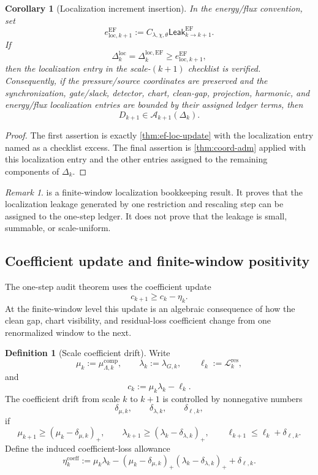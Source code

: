 \documentclass[11pt]{article}
\numberwithin{equation}{section}
\theoremstyle{plain}
\newtheorem{corollary}[theorem]{Corollary}
\theoremstyle{definition}
\newtheorem{definition}[theorem]{Definition}
\theoremstyle{remark}
\newtheorem{remark}[theorem]{Remark}
\newcommand{\comp}{\mathrm{comp}}
\newcommand{\locerr}{\mathrm{loc}}
\newcommand{\Leak}{\mathsf{Leak}}
\begin{document}
\begin{corollary}[Localization increment insertion]\label{cor:ef-loc-insertion}
In the energy/flux convention, set
\[
  e_{\locerr,k+1}^{\mathrm{EF}}
  :=
  C_{\lambda,\chi,\theta}\Leak_{k\to k+1}^{\mathrm{EF}}.
\]
If
\[
  \Delta_k^{\locerr}
  =
  \Delta_k^{\locerr,\mathrm{EF}}
  \ge
  e_{\locerr,k+1}^{\mathrm{EF}},
\]
then the localization entry in the scale-\((k+1)\) checklist is verified.
Consequently, if the pressure/source coordinates are preserved and the
synchronization, gate/slack, detector, chart, clean-gap, projection, harmonic,
and energy/flux localization entries are bounded by their assigned ledger
terms, then
\[
  D_{k+1}\in\mathcal A_{k+1}(\Delta_k).
\]
\end{corollary}

\begin{proof}
The first assertion is exactly \cref{thm:ef-loc-update} with the
localization entry named as a checklist excess.  The final assertion is
\cref{thm:coord-adm} applied with this localization entry and the other
entries assigned to the remaining components of \(\Delta_k\).
\end{proof}

\begin{remark}
 is a finite-window localization bookkeeping result.
It proves that the localization leakage generated by one restriction and
rescaling step can be assigned to the one-step ledger.  It does not prove
that the leakage is small, summable, or scale-uniform.
\end{remark}

\subsection{Coefficient update and finite-window positivity}

The one-step audit theorem uses the coefficient update
\[
  c_{k+1}\ge c_k-\eta_k.
\]
At the finite-window level this update is an algebraic consequence of how the
clean gap, chart visibility, and residual-loss coefficient change from one
renormalized window to the next.

\begin{definition}[Scale coefficient drift]\label{def:coeff-drift}
Write
\[
  \mu_k:=\mu_{\Lambda,k}^{\comp},
  \qquad
  \lambda_k:=\lambda_{G,k},
  \qquad
  \ell_k:=\mathcal L_k^{\mathrm{res}},
\]
and
\[
  c_k:=\mu_k\lambda_k-\ell_k.
\]
The coefficient drift from scale \(k\) to \(k+1\) is controlled by
nonnegative numbers
\[
  \delta_{\mu,k},\qquad
  \delta_{\lambda,k},\qquad
  \delta_{\ell,k},
\]
if
\[
  \mu_{k+1}\ge(\mu_k-\delta_{\mu,k})_+,
  \qquad
  \lambda_{k+1}\ge(\lambda_k-\delta_{\lambda,k})_+,
  \qquad
  \ell_{k+1}\le \ell_k+\delta_{\ell,k}.
\]
Define the induced coefficient-loss allowance
\[
  \eta_k^{\mathrm{coeff}}
  :=
  \mu_k\lambda_k
  -
  (\mu_k-\delta_{\mu,k})_+
  (\lambda_k-\delta_{\lambda,k})_+
  +
  \delta_{\ell,k}.
\]
\end{definition}
\end{document}
